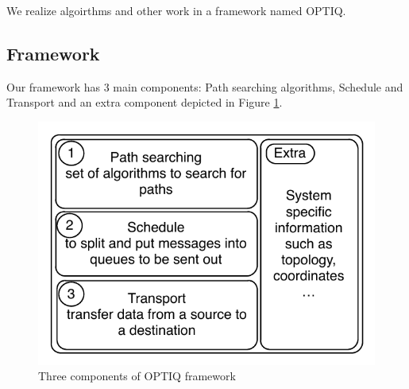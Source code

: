 We realize algoirthms and other work in a framework named OPTIQ. 

\subsection{Framework}

Our framework has 3 main components: Path searching algorithms, Schedule and Transport and an extra component depicted in Figure \ref{fig:framework}.

\begin{figure}[!htb]
\vspace{-0.1in}
\centering
\includegraphics[scale=0.7]{figures/framework.pdf}
\vspace{-0.2in}
\caption{Three components of OPTIQ framework}
\vspace{-0.1in}
\label{fig:framework}
\end{figure}


